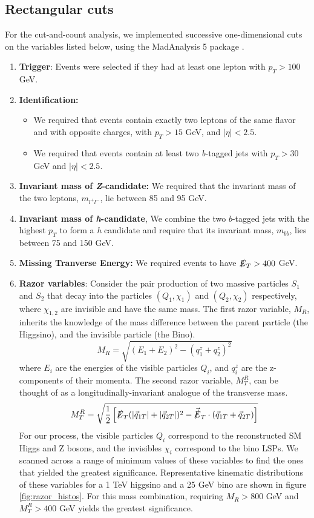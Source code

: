 \subsection{Rectangular cuts}\label{event-selection}

For the cut-and-count analysis, we implemented successive one-dimensional cuts on the variables listed below, using the MadAnalysis 5 package \citep{Conte2013}.

\begin{enumerate}
\item \textbf{Trigger}: Events were selected if they had at least one lepton with $p_{T} > 100$ GeV. 
\item \textbf{Identification:}
  \begin{itemize}
  \item We required that events contain exactly two leptons of the same flavor and with opposite charges, with $p_{T} > 15$ GeV, and $\vert\eta\vert < 2.5$.
  \item We required that events contain at least two \emph{b}-tagged jets with $p_{T} > 30$ GeV and $\vert\eta\vert < 2.5$.
  \end{itemize}
\item \textbf{Invariant mass of \emph{Z}-candidate:} We required that the invariant mass of the two leptons, $m_{l^{+}l^{-}}$, lie between 85 and 95 GeV.
\item \textbf{Invariant mass of \emph{h}-candidate}, We combine the two $b$-tagged jets with the highest $p_{T}$ to form a \emph{h} candidate and require that its invariant mass, $m_{bb}$, lies between 75 and 150 GeV.
\item \textbf{Missing Tranverse Energy:} We required events to have $\slashed{E}_T > 400$ GeV.
\item \textbf{Razor variables}: Consider the pair production of two massive particles $S_1$ and $S_2$ that decay into the particles $(Q_1, \chi_1)$ and $(Q_2, \chi_2)$ respectively, where $\chi_{1,2}$ are invisible and have the same mass. The first razor variable, $M_{R}$, inherits the knowledge of the mass difference between the parent particle (the Higgsino), and the invisible particle (the Bino).
\[M_R = \sqrt{(E_1+E_2)^2 - (q_1^z + q_2^z)^2}\]
where $E_i$ are the energies of the visible particles $Q_i$, and $q_i^z$ are the z-components of their momenta. 
The second razor variable, $M_{T}^{R}$, can be thought of as a longitudinally-invariant analogue of the transverse mass.
\[M_T^R = \sqrt{\frac{1}{2}\left[\slashed{E}_T(|\vec{q}_{1T}|+|\vec{q}_{2T}|)^2 - \vec{\slashed{E}}_T\cdot(\vec{q}_{1T}+\vec{q}_{2T})\right]}\]
For our process, the visible particles $Q_i$ correspond to the reconstructed SM Higgs and Z bosons, and the invisibles $\chi_i$ correspond to the bino LSPs. We scanned across a range of minimum values of these variables to find the ones that yielded the greatest significance. Representative kinematic distributions of these variables for a 1 TeV higgsino and a 25 GeV bino are shown in figure \ref{fig:razor_histos}.  For this mass combination, requiring $M_R > 800$ GeV and $M_T^R > 400$ GeV yields the greatest significance.

\end{enumerate}

